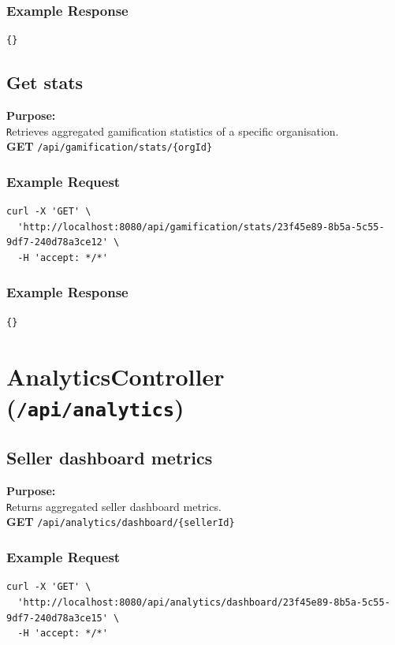 \documentclass[a4paper,11pt]{article}
\begin{document}
\subsubsection*{Example Response}
\begin{lstlisting}
{}
\end{lstlisting}

\subsection{Get stats}
\textbf{Purpose:} \\ \texttt Retrieves aggregated gamification statistics of a specific organisation. \\

\textbf{GET} \texttt{/api/gamification/stats/\{orgId\}}

\subsubsection*{Example Request}
\begin{lstlisting}
curl -X 'GET' \
  'http://localhost:8080/api/gamification/stats/23f45e89-8b5a-5c55-9df7-240d78a3ce12' \
  -H 'accept: */*'
\end{lstlisting}

\subsubsection*{Example Response}
\begin{lstlisting}
{}
\end{lstlisting}

\section{AnalyticsController (\texttt{/api/analytics})}

\subsection{Seller dashboard metrics}
\textbf{Purpose:} \\ \texttt Returns aggregated seller dashboard metrics. \\

\textbf{GET} \texttt{/api/analytics/dashboard/\{sellerId\}}

\subsubsection*{Example Request}
\begin{lstlisting}
curl -X 'GET' \
  'http://localhost:8080/api/analytics/dashboard/23f45e89-8b5a-5c55-9df7-240d78a3ce15' \
  -H 'accept: */*'
\end{lstlisting}
\end{document}
